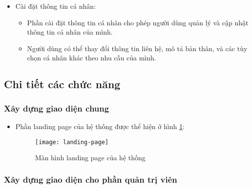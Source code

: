 \documentclass[../Thesis.tex]{subfiles}
\begin{document}
\begin{itemize}
\begin{itemize}
            \end{itemize}
        \item Cài đặt thông tin cá nhân:
            \begin{itemize}
                \item Phần cài đặt thông tin cá nhân cho phép người dùng quản lý và cập nhật thông tin cá nhân của mình.
                \item Người dùng có thể thay đổi thông tin liên hệ, mô tả bản thân, và các tùy chọn cá nhân khác theo nhu cầu của mình.
            \end{itemize}
    \end{itemize}
    
    \subsection{Chi tiết các chức năng}
        \subsubsection{Xây dựng giao diện chung}
        \label{subsubsec:xay-dung-giao-dien-chung}
            \begin{itemize}
                \item Phần landing page của hệ thống được thể hiện ở hình \ref{fig:landing-page}:
                \begin{figure}[hbt!]
                    \centering\texttt{[image: landing-page]}
                    \caption{Màn hình landing page của hệ thống}
                    \label{fig:landing-page}
                \end{figure}
                \FloatBarrier

            \end{itemize}

        \subsubsection{Xây dựng giao diện cho phần quản trị viên}
        \label{subsubsec:xay-dung-giao-dien-admin}
        
\end{document}
